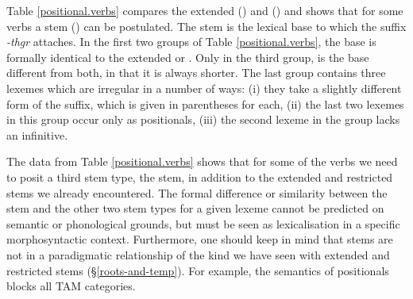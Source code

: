Table \ref{positional.verbs} compares the extended (\Ext) and  (\Rs) and shows that for some verbs a  stem (\Pos) can be postulated. The  stem is the lexical base to which the  suffix \emph{-thgr} attaches. In the first two groups of Table \ref{positional.verbs}, the base is formally identical to the extended or . Only in the third group, is the base different from both, in that it is always shorter. The last group contains three lexemes which are irregular in a number of ways: (i) they take a slightly different form of the  suffix, which is given in parentheses for each, (ii) the last two lexemes in this group occur only as positionals, (iii) the second lexeme in the group lacks an infinitive.%

The data from Table \ref{positional.verbs} shows that for some of the verbs we need to posit a third stem type, the  stem, in addition to the extended and restricted stems we already encountered. The formal difference or similarity between the  stem and the other two stem types for a given lexeme cannot be predicted on semantic or phonological grounds, but must be seen as lexicalisation in a specific morphosyntactic context. Furthermore, one should keep in mind that  stems are not in a paradigmatic relationship of the kind we have seen with extended and restricted stems (\S{}\ref{roots-and-temp}). For example, the  semantics of positionals blocks all  TAM categories.


